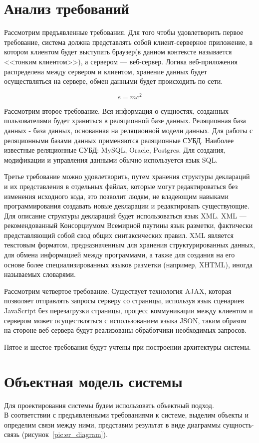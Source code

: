 \documentclass[14pt,a4paper]{reportmod}
\begin{document}
\section{Анализ требований}
Рассмотрим предъявленные требования. Для того чтобы удовлетворить первое требование, система должна представлять собой клиент-серверное приложение, в котором клиентом будет выступать браузер(в данном контексте называется  <<тонким клиентом>>), а сервером --- веб-сервер. Логика веб-приложения распределена между сервером и клиентом, хранение данных будет осуществляться на сервере, обмен данными будет происходить по сети.

\begin{equation}
  e = mc^{2}
\end{equation}


Рассмотрим второе требование. Вся информация о сущностях, созданных пользователями будет храниться в реляционной базе данных. Реляционная база данных - база данных, основанная на реляционной модели данных. Для работы с реляционными базами данных применяются реляционные СУБД. Наиболее известные реляционные СУБД: MySQL, Oracle, Postgres. Для создания, модификации и управления данными обычно используется язык SQL.

Третье требование можно удовлетворить, путем хранения структуры деклараций и их представления в отдельных файлах, которые могут редактироваться без изменения исходного кода, это позволит людям, не владеющим навыками программирования создавать новые декларации и редактировать существующие. Для описание структуры деклараций будет использоваться язык XML. XML --- рекомендованный Консорциумом Всемирной паутины язык разметки, фактически представляющий собой свод общих синтаксических правил. XML является текстовым форматом, предназначенным для хранения структурированных данных, для обмена информацией между программами, а также для создания на его основе более специализированных языков разметки (например, XHTML), иногда называемых словарями.

Рассмотрим четвертое требование. Существует технология AJAX, которая позволяет отправлять запросы серверу со страницы, используя язык сценариев JavaScript без перезагрузки страницы, процесс коммуникации между клиентом и сервером может осуществляться с использованием языка JSON, таким образом на стороне веб-сервера будут реализованы обработчики необходимых запросов.


Пятое и шестое требования будут учтены при построении архитектуры системы.

\section{Объектная модель системы}
Для проектирования системы будем использовать объектный подход.\\
В соответствии с предъявленными требованиями к системе, выделим объекты и определим связи между ними, представим результат в виде диаграммы сущность-связь (рисунок~\ref{pic:er_diagram}).
\end{document}
